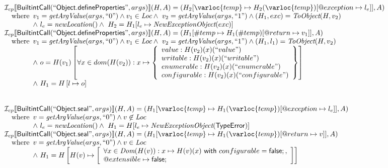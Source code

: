 \[\begin{array}{l}
\I _{cp}\lbr \SF{BuiltintCall}(``\SF{Object.defineProperties}",args)\rbr(H,A)
 = (H_2[\varloc{temp}\mapsto H_2(\varloc{temp})[\varprop{exception}\mapsto l_{e}]], A) \\
\quad\wherec{
  v_1 = \hf{getArgValue}(args, ``0") \land v_1 \in\Loc
  \land\ v_2 = \hf{getArgValue}(args, ``1") \land (H_1, exc) = \hf{ToObject}(H, v_2)\\
  \land\ l_e = \hf{newLocation}() \land\ H_2=H_1[l_e\mapsto\hf{NewExceptionObject}(exc)] }\\

\I _{cp}\lbr \SF{BuiltintCall}(``\SF{Object.defineProperties}",args)\rbr(H,A)
 = (H_1[\#temp \mapsto H_1(\#temp)[@return \mapsto v_1]], A)\\
\quad\wherec{
  v_1 = \hf{getArgValue}(args, ``0") \land v_1 \in\Loc
  \land\ v_2 = \hf{getArgValue}(args, ``1") \land (H_1, l_1) = \hf{ToObject}(H, v_2)\\
  \land\ o = H(v_1)\left[
    \forall x\in dom(H(v_2)): x \mapsto \left\{
      \begin{array}{l}
        value: H(v_2)(x)(``value")\\
        writable: H(v_2)(x)(``writable") \\
        enumerable: H(v_2)(x)(``enumerable")\\
        configurable: H(v_2)(x)(``configurable")\\
      \end{array}
      \right\}
    \right]\\ 
  \land\ H_1=H\left[l\mapsto o\right]}\\
\\\\

\I _{cp}\lbr \SF{BuiltintCall}(``\SF{Object.seal}",args)\rbr(H,A)
 = (H_1[\varloc{temp}\mapsto H_1(\varloc{temp})[\varprop{exception}\mapsto l_{e}]], A) \\
\quad\wherec{
  v = \hf{getArgValue}(args, ``0") \land v\not\in\Loc\\
  \land\ l_e = \hf{newLocation}() \land\ H_1=H[l_e\mapsto\hf{NewExceptionObject}(\SF{TypeError})] }\\
  
\I _{cp}\lbr \SF{BuiltintCall}(``\SF{Object.seal}",args)\rbr(H,A)
 = (H_1[\varloc{temp}\mapsto H_1(\varloc{temp})[\varprop{return}\mapsto v]], A) \\
\quad\wherec{
  v = \hf{getArgValue}(args, ``0") \land v  \in\Loc\\
  \land\ H_1 = H\left[H(v) \mapsto \left[
    \begin{array}{l}
      \forall x \in \hf{Dom}(H(v)):x \mapsto H(v)(x)\rwith configurable=\SF{false};, \\
      \varprop{extensible} \mapsto \SF{false};
    \end{array}\right]\right]\\
   }\\
\\\\


\end{array}\]
